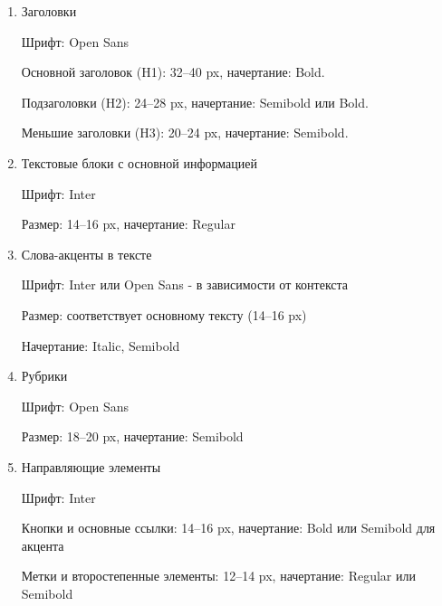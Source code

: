 \noindent
\begin{minipage}{\linewidth}
\end{minipage}
\bigskip

\noindent
\begin{minipage}{\linewidth}
\end{minipage}
\bigskip

\begin{enumerate}
    \item Заголовки

    Шрифт: Open Sans

        Основной заголовок (H1): 32–40 px, начертание: Bold.

        Подзаголовки (H2): 24–28 px, начертание: Semibold или Bold.

        Меньшие заголовки (H3): 20–24 px, начертание: Semibold.

    \item Текстовые блоки с основной информацией

    Шрифт: Inter

        Размер: 14–16 px, начертание: Regular

    \item Слова-акценты в тексте

    Шрифт: Inter или Open Sans - в зависимости от контекста

    Размер: соответствует основному тексту (14–16 px)

    Начертание: Italic, Semibold

    \item Рубрики

    Шрифт: Open Sans

    Размер: 18–20 px, начертание: Semibold

    \item Направляющие элементы

    Шрифт: Inter

        Кнопки и основные ссылки: 14–16 px, начертание: Bold или Semibold для акцента

        Метки и второстепенные элементы: 12–14 px, начертание: Regular или Semibold

\end{enumerate}
\bigskip

